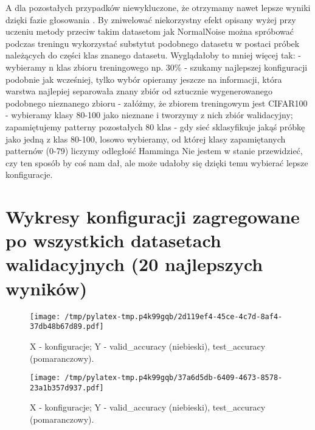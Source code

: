 \documentclass{article}%
\begin{document}
%
A dla pozostałych przypadków niewykluczone, że otrzymamy nawet lepsze wyniki dzięki fazie głosowania\newline%
%
. By zniwelować niekorzystny efekt opisany wyżej przy uczeniu metody przeciw takim datasetom jak NormalNoise można spróbować podczas treningu wykorzystać substytut podobnego datasetu w postaci próbek należących do części klas znanego datasetu.\newline%
%
 Wyglądałoby to mniej więcej tak: \newline%
%
 {-} wybieramy n klas zbioru treningowego np. 30\%\newline%
%
 {-} szukamy najlepszej konfiguracji podobnie jak wcześniej, tylko wybór opieramy jeszcze na informacji, która warstwa najlepiej separowała znany zbiór od sztucznie wygenerowanego podobnego nieznanego zbioru \newline%
%
 {-} załóżmy, że zbiorem treningowym jest CIFAR100 \newline%
%
 {-} wybieramy klasy 80{-}100 jako nieznane i tworzymy z nich zbiór walidacyjny; zapamiętujemy patterny pozostałych 80 klas\newline%
%
 {-} gdy sieć sklasyfikuje jakąś próbkę jako jedną z klas 80{-}100, losowo wybieramy, od której klasy zapamiętanych patternów (0{-}79) liczymy odległość Hamminga\newline%
%
Nie jestem w stanie przewidzieć, czy ten sposób by coś nam dał, ale może udałoby się dzięki temu wybierać lepsze konfiguracje.%
\newpage

%
\section{Wykresy konfiguracji zagregowane po wszystkich datasetach walidacyjnych (20 najlepszych wyników)}%
\label{sec:Wykresykonfiguracjizagregowanepowszystkichdatasetachwalidacyjnych(20najlepszychwynikw)}%


\begin{figure}[h]%
\centering%
\texttt{[image: /tmp/pylatex-tmp.p4k99gqb/2d119ef4-45ce-4c7d-8af4-37db48b67d89.pdf]}%
\caption{X {-} konfiguracje; Y {-} valid\_accuracy (niebieski), test\_accuracy (pomaranczowy).}%
\end{figure}

%
\newpage%


\begin{figure}[h]%
\centering%
\texttt{[image: /tmp/pylatex-tmp.p4k99gqb/37a6d5db-6409-4673-8578-23a1b357d937.pdf]}%
\caption{X {-} konfiguracje; Y {-} valid\_accuracy (niebieski), test\_accuracy (pomaranczowy).}%
\end{figure}
\end{document}
